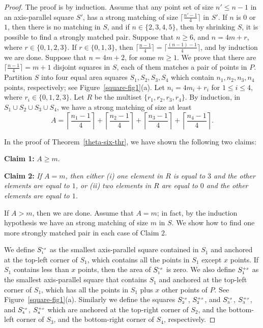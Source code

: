 \documentclass[11pt,a4paper]{article}
\newcommand{\SP}[2]{S^{\text{\tiny +#1}}_\text{\tiny #2}}
\newcommand{\SM}[2]{S^{\text{-\tiny #1}}_\text{\tiny #2}}
\begin{document}
\begin{proof}
The proof is by induction. Assume that any point set of size $n'\le n-1$ in an axis-parallel square $S'$, has a strong matching of size $\lceil \frac{n'-1}{4}\rceil$ in $S'$. If $n$ is $0$ or $1$, then there is no matching in $S$, and if $n\in\{2, 3, 4, 5\}$, then by shrinking $S$, it is possible to find a strongly matched pair. Suppose that $n\ge 6$, and $n=4m+r$, where $r\in\{0,1,2,3\}$. If $r\in\{0, 1,3\}$, then 
$\lceil \frac{n-1}{4}\rceil = \lceil \frac{(n-1)-1}{4}\rceil$, and by
induction we are done. Suppose that $n=4m+2$, for some $m\ge 1$. We prove that there are $\lceil\frac{n-1}{4}\rceil=m+1$ disjoint squares in $S$,
each of them matches a pair of points in $P$. Partition $S$ into four equal area squares $S_1, S_2, S_3, S_4$ which contain $n_1, n_2,n_3, n_4$ points, respectively; see Figure~\ref{square-fig1}(a). Let $n_i=4m_i+r_i$ for $1\le i\le 4$, where $r_i\in\{0,1,2,3\}$. Let $R$ be the multiset $\{r_1,r_2,r_3,r_4\}$. 
By induction, in $S_1\cup S_2\cup S_3\cup S_4$, we have a strong matching of size at least
\begin{equation}
A=\left\lceil\frac{n_1-1}{4}\right\rceil + \left\lceil\frac{n_2-1}{4}\right\rceil +\left\lceil\frac{n_3-1}{4}\right\rceil+\left\lceil \frac{n_4-1}{4}\right\rceil.\nonumber
\end{equation} 

In the proof of Theorem~\ref{theta-six-thr}, we have shown the following two claims:

{\bf Claim 1:} {$A\ge m$.}

{\bf Claim 2:} {\em If $A=m$, then either (i) one element in $R$ is equal to $3$ and the other elements are equal to $1$, or (ii) two elements in $R$ are equal to $0$ and the other elements are equal to $1$.}


If $A> m$, then we are done. Assume that $A=m$; in fact, by the induction hypothesis we have an strong matching of size $m$ in $S$. 
We show how to find one more strongly matched pair in each case of Claim 2.

We define $\SM{$x$}{1}$ as the smallest axis-parallel square contained in $S_1$ and anchored at the top-left corner of $S_1$, which contains all the points in $S_1$ except $x$ points. If $S_1$ contains less than $x$ points, then the area of $\SM{$x$}{1}$ is zero. We also define $\SP{$x$}{1}$ as the smallest axis-parallel square that contains $S_1$ and anchored at the top-left corner of $S_1$, which has all the points in $S_1$ plus $x$ other points of $P$. See Figure~\ref{square-fig1}(a). Similarly we define the squares $\SM{$x$}{2}$, $\SP{$x$}{2}$, and $\SM{$x$}{3}$, $\SP{$x$}{3}$, and $\SM{$x$}{4}$, $\SP{$x$}{4}$ which are anchored at the top-right corner of $S_2$, and the bottom-left corner of $S_3$, and the bottom-right corner of $S_4$, respectively.


\end{proof}
\end{document}
